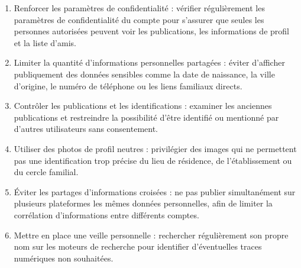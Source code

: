 \documentclass[14pt]{article}
\begin{document}
\begin{enumerate}
    \item Renforcer les paramètres de confidentialité : vérifier régulièrement les paramètres de confidentialité du compte pour s’assurer que seules les personnes autorisées peuvent voir les publications, les informations de profil et la liste d’amis.

    \item Limiter la quantité d’informations personnelles partagées : éviter d’afficher publiquement des données sensibles comme la date de naissance, la ville d’origine, le numéro de téléphone ou les liens familiaux directs.

    \item Contrôler les publications et les identifications : examiner les anciennes publications et restreindre la possibilité d’être identifié ou mentionné par d’autres utilisateurs sans consentement.

    \item Utiliser des photos de profil neutres : privilégier des images qui ne permettent pas une identification trop précise du lieu de résidence, de l’établissement ou du cercle familial.

    \item Éviter les partages d’informations croisées : ne pas publier simultanément sur plusieurs plateformes les mêmes données personnelles, afin de limiter la corrélation d’informations entre différents comptes.

    \item Mettre en place une veille personnelle : rechercher régulièrement son propre nom sur les moteurs de recherche pour identifier d’éventuelles traces numériques non souhaitées.

    
\end{enumerate}

\vspace{1cm}
\end{document}
